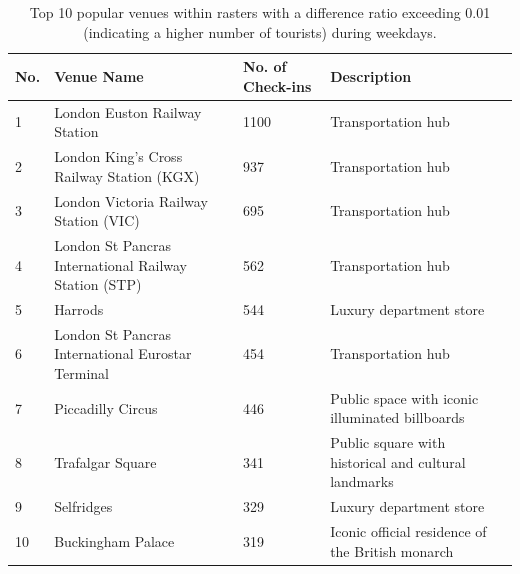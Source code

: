 \documentclass{article}
\begin{document}
\begin{table}[!h]
\centering
\caption{\label{tab:popular_venues_touristspop_weekday}Top 10 popular venues within rasters with a difference ratio exceeding 0.01 (indicating a higher number of tourists) during weekdays.}
\begin{adjustbox}{max width=\textwidth, margin=0cm}
\begin{threeparttable}
\begin{tabular}{lp{5cm}lp{4cm}} \hline
No. & Venue Name & No. of Check-ins & Description \\ \hline
1 & London Euston Railway Station & 1100 & Transportation hub \\
2 & London King's Cross Railway Station (KGX) & 937 & Transportation hub \\
3 & London Victoria Railway Station (VIC) & 695 & Transportation hub \\
4 & London St Pancras International Railway Station (STP) & 562 & Transportation hub \\
5 & Harrods & 544 & Luxury department store \\
6 & London St Pancras International Eurostar Terminal & 454 & Transportation hub \\
7 & Piccadilly Circus & 446 & Public space with iconic illuminated billboards \\
8 & Trafalgar Square & 341 & Public square with historical and cultural landmarks \\
9 & Selfridges & 329 & Luxury department store \\
10 & Buckingham Palace & 319 & Iconic official residence of the British monarch \\ \hline
\end{tabular}
\end{threeparttable}
\end{adjustbox}
\end{table}
\end{document}
